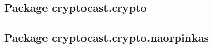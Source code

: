 \documentclass[a4paper,10pt]{scrartcl}
\begin{document}
	
\subsection{Package cryptocast.crypto}
\subsection{Package cryptocast.crypto.naorpinkas}
	
\end{document}
